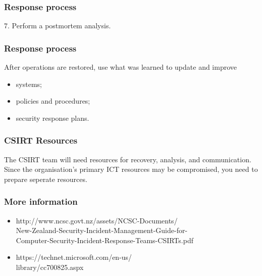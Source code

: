 \documentclass[10pt]{beamer}
\begin{document}
\begin{frame}
	\frametitle{Response process}
	
	7. Perform a postmortem analysis.
\end{frame}

\begin{frame}
	\frametitle{Response process}
	
	After operations are restored, use what was learned to 
	update and improve 
	\begin{itemize}
		\item systems;
		\item policies and procedures;
		\item security response plans.
	\end{itemize}
\end{frame}

\begin{frame}
	\frametitle{CSIRT Resources}
	
	The CSIRT team will need resources for recovery, analysis,
	and communication.  Since the organisation's primary ICT resources may be
	compromised, you need to prepare seperate resources.
\end{frame}
	
	\begin{frame}
		\frametitle{More information}
		
		\begin{itemize}
			\item http://www.ncsc.govt.nz/assets/NCSC-Documents/ \\
			New-Zealand-Security-Incident-Management-Guide-for- \\
			Computer-Security-Incident-Response-Teams-CSIRTs.pdf 
			\item https://technet.microsoft.com/en-us/ \\ library/cc700825.aspx
		\end{itemize}
	\end{frame}
	
\end{document}
